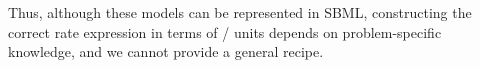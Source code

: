 Thus, although these models can be represented in SBML,
constructing the correct rate expression in terms of
/ units depends on
problem-specific knowledge, and we cannot provide a general
recipe.









